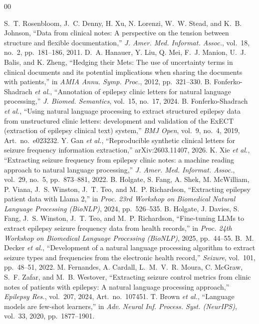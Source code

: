 \documentclass[conference]{IEEEtran}
\begin{document}
\begin{thebibliography}{00}

 S.~T. Rosenbloom, J.~C. Denny, H. Xu, N. Lorenzi, W.~W. Stead, and K.~B. Johnson, ``Data from clinical notes: A perspective on the tension between structure and flexible documentation,'' \emph{J. Amer. Med. Informat. Assoc.}, vol.~18, no.~2, pp.~181--186, 2011.
 D.~A. Hanauer, Y. Liu, Q. Mei, F.~J. Manion, U.~J. Balis, and K. Zheng, ``Hedging their Mets: The use of uncertainty terms in clinical documents and its potential implications when sharing the documents with patients,'' in \emph{AMIA Annu. Symp. Proc.}, 2012, pp.~321--330.
 B. Fonferko-Shadrach \emph{et al.}, ``Annotation of epilepsy clinic letters for natural language processing,'' \emph{J. Biomed. Semantics}, vol.~15, no.~17, 2024.
 B. Fonferko-Shadrach \emph{et al.}, ``Using natural language processing to extract structured epilepsy data from unstructured clinic letters: development and validation of the ExECT (extraction of epilepsy clinical text) system,'' \emph{BMJ Open}, vol.~9, no.~4, 2019, Art.~no.~e023232.
 Y. Gan \emph{et al.}, ``Reproducible synthetic clinical letters for seizure frequency information extraction,'' arXiv:2603.11407, 2026.
 K. Xie \emph{et al.}, ``Extracting seizure frequency from epilepsy clinic notes: a machine reading approach to natural language processing,'' \emph{J. Amer. Med. Informat. Assoc.}, vol.~29, no.~5, pp.~873--881, 2022.
 B. Holgate, S. Fang, A. Shek, M. McWilliam, P. Viana, J.~S. Winston, J.~T. Teo, and M.~P. Richardson, ``Extracting epilepsy patient data with Llama 2,'' in \emph{Proc. 23rd Workshop on Biomedical Natural Language Processing (BioNLP)}, 2024, pp.~526--535.
 B. Holgate, J. Davies, S. Fang, J.~S. Winston, J.~T. Teo, and M.~P. Richardson, ``Fine-tuning LLMs to extract epilepsy seizure frequency data from health records,'' in \emph{Proc. 24th Workshop on Biomedical Language Processing (BioNLP)}, 2025, pp.~44--55.
 B.~M. Decker \emph{et al.}, ``Development of a natural language processing algorithm to extract seizure types and frequencies from the electronic health record,'' \emph{Seizure}, vol.~101, pp.~48--51, 2022.
 M. Fernandes, A. Cardall, L.~M.~V.~R. Moura, C. McGraw, S.~F. Zafar, and M.~B. Westover, ``Extracting seizure control metrics from clinic notes of patients with epilepsy: A natural language processing approach,'' \emph{Epilepsy Res.}, vol.~207, 2024, Art.~no.~107451.
 T. Brown \emph{et al.}, ``Language models are few-shot learners,'' in \emph{Adv. Neural Inf. Process. Syst. (NeurIPS)}, vol.~33, 2020, pp.~1877--1901.

\end{thebibliography}
\end{document}
